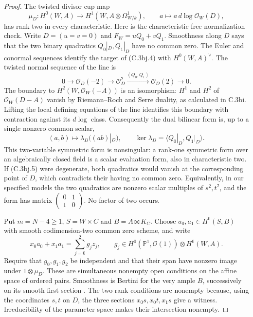 \begin{proof}
The twisted divisor cup map
\[
 \mu_D:H^0(W,A)\longrightarrow H^1(W,A\otimes\Omega^1_{W/k}),
 \qquad a\longmapsto a\,d\log\mathcal O_W(D),
 \tag{C.3bj.4}
\]
has rank two in every characteristic. Here is the characteristic-free
normalization check. Write $D=(u=v=0)$ and $F_W=uQ_0+vQ_1$.
Smoothness along $D$ says that the two binary quadratics
$Q_0|_D,Q_1|_D$ have no common zero. The Euler and conormal sequences
identify the target of (C.3bj.4) with $H^0(W,A)^\vee$.
The twisted normal sequence of the line is
\[
 0\longrightarrow\mathcal O_D(-2)\longrightarrow\mathcal O_D^2
       \xrightarrow{(Q_0,Q_1)}\mathcal O_D(2)\longrightarrow0.
\]
The boundary to $H^2(W,\mathcal O_W(-A))$ is an isomorphism:
$H^1$ and $H^2$ of $\mathcal O_W(D-A)$ vanish by Riemann--Roch
and Serre duality, as calculated in C.3bi. Lifting the local defining
equations of the line identifies this boundary with contraction
against its $d\log$ class. Consequently the dual bilinear form is,
up to a single nonzero common scalar,
\[
 (a,b)\longmapsto\lambda_D((ab)|_D),
 \qquad
 \ker\lambda_D=\langle Q_0|_D,Q_1|_D\rangle.
 \tag{C.3bj.5}
\]
This two-variable symmetric form is nonsingular: a rank-one symmetric
form over an algebraically closed field is a scalar evaluation form,
also in characteristic two. If (C.3bj.5) were degenerate, both
quadratics would vanish at the corresponding point of $D$, which
contradicts their having no common zero. Equivalently, in our specified
models the two quadratics are nonzero scalar multiples of $s^2,t^2$,
and the form has matrix $\left(\begin{smallmatrix}0&1\\1&0\end{smallmatrix}\right)$.
No factor of two occurs.

Put $m=N-4\ge1$, $S=W\times C$ and $B=A\boxtimes K_C$.
Choose $a_0,a_1\in H^0(S,B)$ with smooth codimension-two common
zero scheme, and write
\[
 x_0a_0+x_1a_1=\sum_{j=0}^2g_j z_j,
 \qquad g_j\in H^0(\mathbb P^1,\mathcal O(1))\otimes H^0(W,A).
\]
Require that $g_0,g_1,g_2$ be independent and that their span have
nonzero image under $1\otimes\mu_D$. These are simultaneous nonempty
open conditions on the affine space of ordered pairs. Smoothness is
Bertini for the very ample $B$, successively on its smooth first
section \citep[Lemma 33.47.3, Tag 0FD6]{D_StacksBertiniUniformHigher}.
The two rank conditions are nonempty because, using the coordinates
$s,t$ on $D$, the three sections $x_0s,x_0t,x_1s$ give a witness.
Irreducibility of the parameter space makes their intersection nonempty.


\end{proof}
